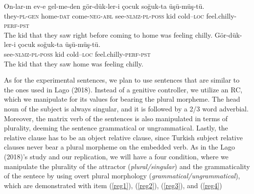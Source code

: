 \documentclass[11pt,a4paper]{article}
\begin{document}
\begin{exe}
\ex
\begin{xlist}
\ex \label{rcexample}
\gll On-lar-{\i}n ev-e gel-me-den g\"{o}r-d\"{u}k-ler-i \c{c}ocuk so\u{g}uk-ta \"{u}\c{s}\"{u}-m\"{u}\c{s}-t\"{u}.\\
they-\textsc{pl}-\textsc{gen} home-\textsc{dat} come-\textsc{neg}-\textsc{abl} see-\textsc{nlmz}-\textsc{pl}-\textsc{poss} kid cold--\textsc{loc} feel.chilly-\textsc{perf}-\textsc{pst}\\
\glt The kid that they saw right before coming to home was feeling chilly. 
\ex \label{rcexample2}
\gll G\"{o}r-d\"{u}k-ler-i \c{c}ocuk so\u{g}uk-ta \"{u}\c{s}\"{u}-m\"{u}\c{s}-t\"{u}.\\
see-\textsc{nlmz}-\textsc{pl}-\textsc{poss} kid cold--\textsc{loc} feel.chilly-\textsc{perf}-\textsc{pst}\\
\glt The kid that they saw home was feeling chilly.
\end{xlist}
\end{exe}

As for the experimental sentences, we plan to use sentences that are
similar to the ones used in Lago (2018). Instead of a genitive
controller, we utilize an RC, which we manipulate for its values for
bearing the plural morpheme. The head noun of the subject is always
singular, and it is followed by a 2/3 word adverbial. Moreover, the
matrix verb of the sentences is also manipulated in terms of plurality,
deeming the sentence grammatical or ungrammatical. Lastly, the relative
clause has to be an object relative clause, since Turkish subject
relative clauses never bear a plural morpheme on the embedded verb. As
in the Lago (2018)'s study and our replication, we will have a four
condition, where we manipulate the plurality of the attractor
(\emph{plural/singular}) and the grammaticality of the sentece by using
overt plural morphology (\emph{grammatical/ungrammatical}), which are
demonstrated with item (\ref{reg1}), (\ref{reg2}), (\ref{reg3}), and
(\ref{reg4})
\end{document}
